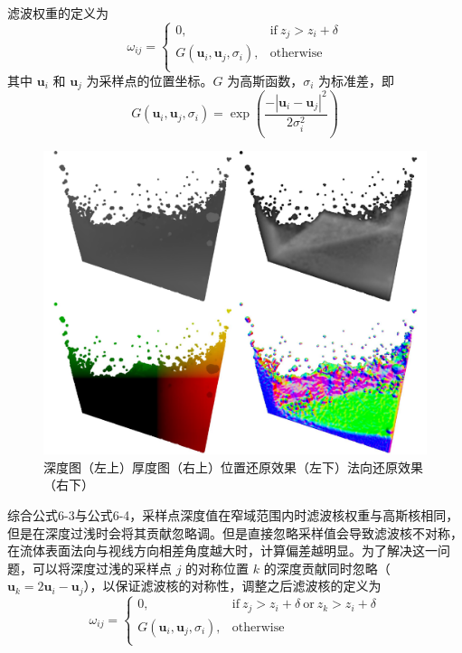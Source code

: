     滤波权重的定义为
    \begin{equation}
    	\omega_{ij} =
    	\left\{
    	\begin{array}{ll}
    	0, 											& \mathrm{if} \ z_j > z_i + \delta \\
    	G(\mathbf{u}_i, \mathbf{u}_j, \sigma_i),   	& \mathrm{otherwise} \\
    	\end{array}
    	\right.
    \end{equation}
    其中 $\mathbf{u}_i$ 和 $\mathbf{u}_j$ 为采样点的位置坐标。$G$ 为高斯函数，$\sigma_i$ 为标准差，即
    \begin{equation}
    	G(\mathbf{u}_i, \mathbf{u}_j, \sigma_i) = \exp (\frac {-|\mathbf{u}_i - \mathbf{u}_j|^2} {2\sigma_i^2})
    \end{equation}
    
    \begin{figure}
    	\centering
    	\includegraphics[width=.8\textwidth]{figures/rendering/d_t_p_n.pdf}
    	\caption{深度图（左上）厚度图（右上）位置还原效果（左下）法向还原效果（右下）}
        \label{fig:dtpn}
    \end{figure}
    
    综合公式6-3与公式6-4，采样点深度值在窄域范围内时滤波核权重与高斯核相同，但是在深度过浅时会将其贡献忽略调。但是直接忽略采样值会导致滤波核不对称，在流体表面法向与视线方向相差角度越大时，计算偏差越明显。为了解决这一问题，可以将深度过浅的采样点 $j$ 的对称位置 $k$ 的深度贡献同时忽略（$\mathbf{u}_k = 2\mathbf{u}_i - \mathbf{u}_j$），以保证滤波核的对称性，调整之后滤波核的定义为
    \begin{equation}
    	\omega_{ij} =
    	\left\{
    	\begin{array}{ll}
    	0, 											& \mathrm{if} \ z_j > z_i + \delta \ \mathrm{or} \ z_k > z_i + \delta \\
    	G(\mathbf{u}_i, \mathbf{u}_j, \sigma_i),   	& \mathrm{otherwise} \\
    	\end{array}
    	\right.
    \end{equation}
    
